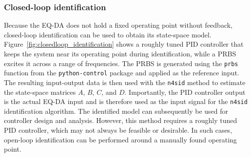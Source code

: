 \documentclass[12pt,a4paper]{article}
\begin{document}
\subsubsection{Closed-loop identification}
Because the EQ-DA does not hold a fixed operating point without feedback, closed-loop identification can be used to obtain its state-space model. Figure~\ref{fig:closedloop_identification} shows a roughly tuned PID controller that keeps the system near its operating point during identification, while a PRBS excites it across a range of frequencies. The PRBS is generated using the \texttt{prbs} function from the \texttt{python-control} package and applied as the reference input. The resulting input-output data is then used with the \texttt{n4sid} method to estimate the state-space matrices $A$, $B$, $C$, and $D$. Importantly, the PID controller output is the actual EQ-DA input and is therefore used as the input signal for the \texttt{n4sid} identification algorithm. The identified model can subsequently be used for controller design and analysis. However, this method requires a roughly tuned PID controller, which may not always be feasible or desirable. In such cases, open-loop identification can be performed around a manually found operating point.
\end{document}
